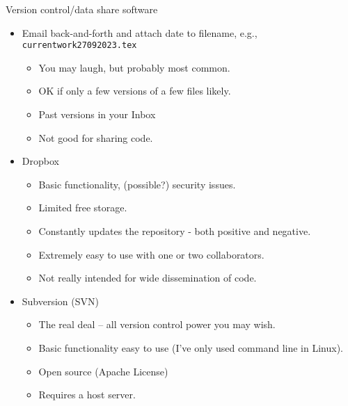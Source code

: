\documentclass{beamer}
\begin{document}
\begin{frame}{Version control/data share software}

 \begin{itemize}
 \item Email back-and-forth and attach date to filename, e.g., {\texttt{currentwork27092023.tex}} 
   \begin{itemize}
   \item You may laugh, but probably most common.
   \item OK if only a few versions of a few files likely.
     \item Past versions in your Inbox
      \item Not good for sharing code.\pause
   \end{itemize}
\item Dropbox 
  \begin{itemize}
  \item Basic functionality, (possible?) security issues.
  \item Limited free storage.
   \item Constantly updates the repository - both positive and negative.
  \item Extremely easy to  use  with one or two collaborators.  
  \item Not really intended for wide dissemination of code.\pause
  \end{itemize}
\item Subversion (SVN)
  \begin{itemize}
  \item The real deal -- all version control power you may wish.
  \item Basic functionality easy to use (I've only used command line in Linux).
  \item Open source (Apache License)
  \item Requires a host server.
  \end{itemize}
 \end{itemize}
\end{frame}
\end{document}
